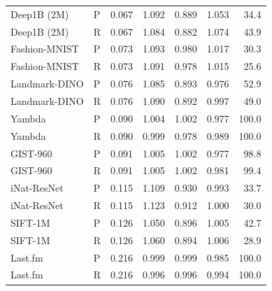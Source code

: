 \begin{tabular}{llrrrrr}
Deep1B (2M) & P & 0.067 & 1.092 & 0.889 & 1.053 & 34.4 \\
Deep1B (2M) & R & 0.067 & 1.084 & 0.882 & 1.074 & 43.9 \\
Fashion-MNIST & P & 0.073 & 1.093 & 0.980 & 1.017 & 30.3 \\
Fashion-MNIST & R & 0.073 & 1.091 & 0.978 & 1.015 & 25.6 \\
Landmark-DINO & P & 0.076 & 1.085 & 0.893 & 0.976 & 52.9 \\
Landmark-DINO & R & 0.076 & 1.090 & 0.892 & 0.997 & 49.0 \\
Yambda & P & 0.090 & 1.004 & 1.002 & 0.977 & 100.0 \\
Yambda & R & 0.090 & 0.999 & 0.978 & 0.989 & 100.0 \\
GIST-960 & P & 0.091 & 1.005 & 1.002 & 0.977 & 98.8 \\
GIST-960 & R & 0.091 & 1.005 & 1.002 & 0.981 & 99.4 \\
iNat-ResNet & P & 0.115 & 1.109 & 0.930 & 0.993 & 33.7 \\
iNat-ResNet & R & 0.115 & 1.123 & 0.912 & 1.000 & 30.0 \\
SIFT-1M & P & 0.126 & 1.050 & 0.896 & 1.005 & 42.7 \\
SIFT-1M & R & 0.126 & 1.060 & 0.894 & 1.006 & 28.9 \\
Last.fm & P & 0.216 & 0.999 & 0.999 & 0.985 & 100.0 \\
Last.fm & R & 0.216 & 0.996 & 0.996 & 0.994 & 100.0 \\
\bottomrule
\end{tabular}
